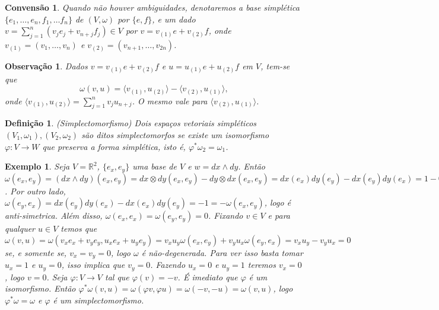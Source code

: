 \documentclass[12pt]{book}
\newtheorem{convensao}[teorema]{Convensão}
\newtheorem{definicao}[teorema]{Definição}
\newtheorem{exemplo}[teorema]{Exemplo}
\newtheorem{observacao}[teorema]{Observação}
\newcommand{\formaSimpletica}[2]{\omega(#1, #2)}
\newcommand{\produtointerno}[2]{\langle #1, #2 \rangle}
\newcommand{\real}[1]{\mathbb{R}^{#1}}
\begin{document}
	\begin{convensao}\label{convensao_base_simpletica}
		Quando não houver ambiguidades, denotaremos a base simplética  $\{ e_{1},\dots, e_{n},f_{1},\dots f_{n}\}$  de $(V, \omega)$ por  $\{ e ,f\}$, e um dado $v =\sum_{j=1}^{n}( v_{j}e_{j} +v_{n+j}f_{j}) \in V$ por $v=v_{(1)}e+v_{(2)}f$, onde $v_{(1)}=(v_{1}, \dots, v_{n})$ e $v_{(2)}=(v_{n+1}, \dots, v_{2n})$.
	\end{convensao}
	
	\begin{observacao}\label{observacao_convensao_base_simpletica}
		Dados $v=v_{(1)}e+v_{(2)}f$ e $u=u_{(1)}e+u_{(2)}f$ em $V$, tem-se que 
		$$
		\formaSimpletica{v}{u} = \produtointerno{v_{(1)}}{u_{(2)}}-\produtointerno{v_{(2)}}{u_{(1)}}, 
		$$
		onde $\produtointerno{v_{(1)}}{u_{(2)}}=\sum_{j=1}^{n}v_{j}u_{n+j}$. O mesmo vale para $\produtointerno{v_{(2)}}{u_{(1)}}$.
	\end{observacao}
	
	\begin{definicao}
		(Simplectomorfismo) Dois espaços vetoriais simpléticos $(V_{1}, \omega_{1}), (V_{2}, \omega_{2})$ são ditos simplectomorfos se existe um isomorfismo $\varphi:V\to W$ que preserva a forma simplética, isto é, $\varphi^{*}\omega_{2} = \omega_{1}$.
	\end{definicao}
	\begin{exemplo}\label{exemplo_espaco_simpletico_real}
		Seja $V = \real{2}$, $\{e_{x}, e_{y}\}$ uma base de $V$ e $w=dx \wedge dy$. Então $\omega(e_{x}, e_{y}) = (dx \wedge dy)(e_{x}, e_{y}) = dx\otimes dy(e_{x}, e_{y})-dy\otimes dx(e_{x}, e_{y}) =dx(e_{x}) dy(e_{y}) - dx(e_{y}) dy(e_{x}) = 1-0= 1$. Por outro lado, $\omega(e_{y}, e_{x}) =dx(e_{y}) dy(e_{x}) - dx(e_{x}) dy(e_{y}) =-1 =-\omega(e_{x}, e_{y})$, logo é anti-simetrica. Além disso, $\omega(e_{x}, e_{x}) = \omega(e_{y}, e_{y}) = 0$. Fixando $v \in V$ e para qualquer $u \in V$ temos que $\omega(v, u) = \omega(v_{x}e_{x}+v_{y}e_{y}, u_{x}e_{x}+u_{y}e_{y}) = v_{x}u_{y}\omega(e_{x}, e_{y}) +v_{y}u_{x}\omega(e_{y}, e_{x}) = v_{x}u_{y} -v_{y}u_{x} = 0$ se, e somente se, $v_{x}=v_{y}=0$, logo $\omega$ é não-degenerada. Para ver isso basta tomar $u_{x} = 1$ e $u_{y} = 0$, isso implica que $v_{y} = 0$. Fazendo $u_{x} = 0$ e $u_{y} = 1$ teremos $v_{x} = 0$, logo $v=0$. Seja $\varphi:V \to V$ tal que $\varphi(v) = -v$. É imediato que $\varphi$ é um isomorfismo. Então $\varphi^{*}\omega(v, u) = \omega(\varphi v, \varphi u)=\omega(-v, -u)=\omega(v, u)$, logo $\varphi^{*}\omega = \omega$ e $\varphi$ é um simplectomorfismo.
	\end{exemplo}
	
\end{document}
